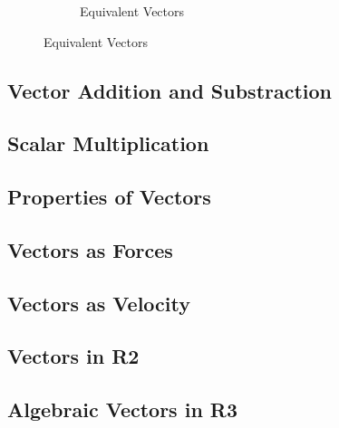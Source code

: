 \documentclass[12pt]{article}
\begin{document}
\begin{flushleft}
\begin{figure}[h]
\begin{subfigure}[b]{0.4\linewidth}
                    \centering
                    \caption{Equivalent Vectors}

                \end{subfigure}

            \end{figure}

        \end{flushleft}

        \subsection{Vector Addition and Substraction}

            \begin{flushleft}



            \end{flushleft}

        \subsection{Scalar Multiplication}
        \subsection{Properties of Vectors}
        \subsection{Vectors as Forces}
        \subsection{Vectors as Velocity}
        \subsection{Vectors in R2}
        \subsection{Algebraic Vectors in R3}
\end{document}

